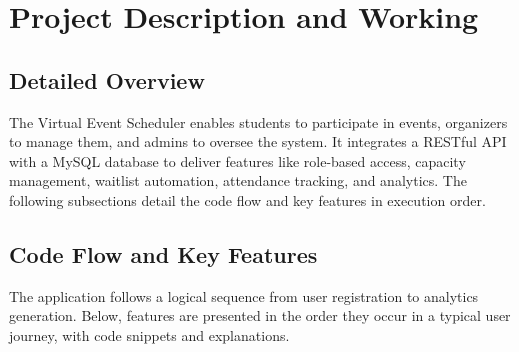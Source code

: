 \documentclass[12pt]{article}
\begin{document}
\section{Project Description and Working}
\subsection{Detailed Overview}
The Virtual Event Scheduler enables students to participate in events, organizers to manage them, and admins to oversee the system. It integrates a RESTful API with a MySQL database to deliver features like role-based access, capacity management, waitlist automation, attendance tracking, and analytics. The following subsections detail the code flow and key features in execution order.

\subsection{Code Flow and Key Features}
The application follows a logical sequence from user registration to analytics generation. Below, features are presented in the order they occur in a typical user journey, with code snippets and explanations.
\end{document}

